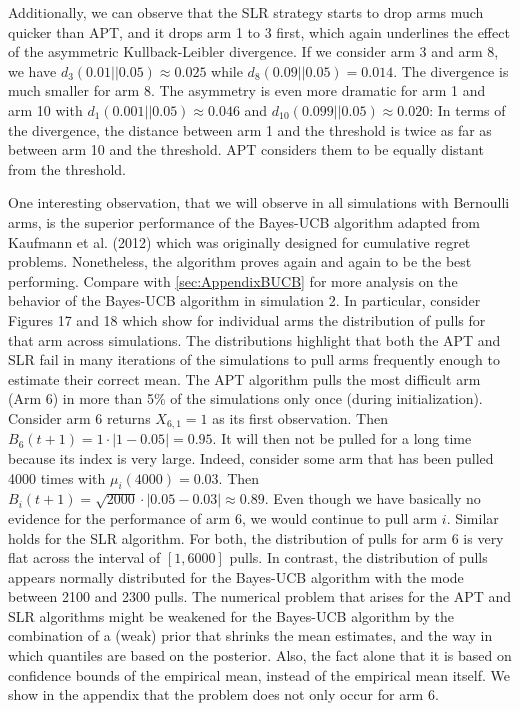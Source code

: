 \documentclass[11pt,]{article}
\begin{document}
Additionally, we can observe that the SLR strategy starts to drop arms
much quicker than APT, and it drops arm 1 to 3 first, which again
underlines the effect of the asymmetric Kullback-Leibler divergence. If
we consider arm 3 and arm 8, we have \(d_3(0.01||0.05) \approx 0.025\)
while \(d_8(0.09||0.05) = 0.014\). The divergence is much smaller for
arm 8. The asymmetry is even more dramatic for arm 1 and arm 10 with
\(d_1(0.001||0.05) \approx 0.046\) and
\(d_{10}(0.099||0.05) \approx 0.020\): In terms of the divergence, the
distance between arm 1 and the threshold is twice as far as between arm
10 and the threshold. APT considers them to be equally distant from the
threshold.

One interesting observation, that we will observe in all simulations
with Bernoulli arms, is the superior performance of the Bayes-UCB
algorithm adapted from Kaufmann et al. (2012) which was originally
designed for cumulative regret problems. Nonetheless, the algorithm
proves again and again to be the best performing. Compare with
\autoref{sec:AppendixBUCB} for more analysis on the behavior of the
Bayes-UCB algorithm in simulation 2. In particular, consider Figures 17
and 18 which show for individual arms the distribution of pulls for that
arm across simulations. The distributions highlight that both the APT
and SLR fail in many iterations of the simulations to pull arms
frequently enough to estimate their correct mean. The APT algorithm
pulls the most difficult arm (Arm 6) in more than 5\% of the simulations
only once (during initialization). Consider arm 6 returns
\(X_{6,1} = 1\) as its first observation. Then
\(B_6(t+1) = 1 \cdot |1-0.05| = 0.95\). It will then not be pulled for a
long time because its index is very large. Indeed, consider some arm
that has been pulled 4000 times with \(\mu_i(4000) = 0.03\). Then
\(B_i(t+1) = \sqrt{2000} \cdot |0.05-0.03| \approx 0.89\). Even though
we have basically no evidence for the performance of arm \(6\), we would
continue to pull arm \(i\). Similar holds for the SLR algorithm. For
both, the distribution of pulls for arm 6 is very flat across the
interval of \([1,6000]\) pulls. In contrast, the distribution of pulls
appears normally distributed for the Bayes-UCB algorithm with the mode
between 2100 and 2300 pulls. The numerical problem that arises for the
APT and SLR algorithms might be weakened for the Bayes-UCB algorithm by
the combination of a (weak) prior that shrinks the mean estimates, and
the way in which quantiles are based on the posterior. Also, the fact
alone that it is based on confidence bounds of the empirical mean,
instead of the empirical mean itself. We show in the appendix that the
problem does not only occur for arm 6.
\end{document}
